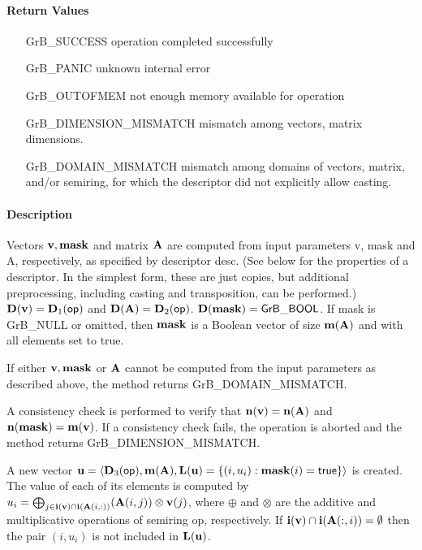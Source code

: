 \paragraph{Return Values}

\begin{itemize}[leftmargin=2.1in]
\item[{\sf GrB\_SUCCESS}]             operation completed successfully
\item[{\sf GrB\_PANIC}]               unknown internal error
\item[{\sf GrB\_OUTOFMEM}]            not enough memory available for operation
\item[{\sf GrB\_DIMENSION\_MISMATCH}] mismatch among vectors, matrix dimensions.
\item[{\sf GrB\_DOMAIN\_MISMATCH}]    mismatch among domains of vectors, matrix, and/or semiring, for which the descriptor did not explicitly allow casting.
\end{itemize}


\paragraph{Description}

Vectors ${\bf v}, {\bf mask}$ and matrix ${\bf A}$ are computed from
input parameters {\sf v}, {\sf mask} and {\sf A}, respectively, as specified
by descriptor {\sf desc}. (See below for the properties of a descriptor. In
the simplest form, these are just copies, but additional preprocessing,
including casting and transposition, can be performed.)  $\bold{D}({\bf v}) =
\bold{D}_1({\sf op})$ and $\bold{D}({\bf A}) = \bold{D}_2({\sf op})$.
$\bold{D}({\bf mask}) = {\sf GrB\_BOOL}$.  If {\sf mask} is {\sf GrB\_NULL} or omitted,
then ${\bf mask}$ is a Boolean vector of size $\bold{m}({\bf A})$
and with all elements set to {\sf true}.

If either ${\bf v}, {\bf mask}$ or ${\bf A}$ cannot be computed
from the input parameters as described above, the method returns {\sf
GrB\_DOMAIN\_MISMATCH}.

A consistency check is performed to verify that $\bold{n}({\bf v})
= \bold{n}({\bf A})$ and $\bold{n}({\bf mask}) =
\bold{m}({\bf v})$. If a consistency check fails, the operation is
aborted and the method returns {\sf GrB\_DIMENSION\_MISMATCH}.

A new vector ${\bf u} = \langle \bold{D}_3({\sf op}),
\bold{m}({\bf A}), \bold{L}({\bf u}) = \{(i,u_i) : {\bf mask}(i)
= {\sf true} \} \rangle$ is created.  The value of each of its elements
is computed by $u_i = \bigoplus_{j \in {\bf i}({\bf v}) \cap
{\bf i}({\bf A}(i,:))} ({\bf A}(i,j)) \otimes {\bf v}(j)$,
where $\oplus$ and $\otimes$ are the additive and multiplicative
operations of semiring {\sf op}, respectively.  If ${\bf i}({\bf v})
\cap {\bf i}({\bf A}(:,i)) = \emptyset$ then the pair $(i,u_i)$
is not included in $\bold{L}({\bf u})$.

